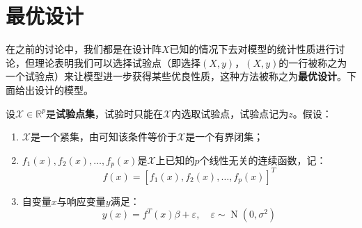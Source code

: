 \section{最优设计}
在之前的讨论中，我们都是在设计阵$X$已知的情况下去对模型的统计性质进行讨论，但理论表明我们可以选择试验点（即选择$(X,y)$，$(X,y)$的一行被称之为一个试验点）来让模型进一步获得某些优良性质，这种方法被称之为\textbf{最优设计}。下面给出设计的模型。

\begin{definition}\label{model:design}
	设$\mathcal{X}\in\mathbb{R}^{p}$是\textbf{试验点集}，试验时只能在$\mathcal{X}$内选取试验点，试验点记为$z$。假设：
	\begin{enumerate}
		\item $\mathcal{X}$是一个紧集，由可知该条件等价于$\mathcal{X}$是一个有界闭集；
		\item $f_1(x),f_2(x),\dots,f_p(x)$是$\mathcal{X}$上已知的$p$个线性无关的连续函数，记：
		\begin{equation*}
			f(x)=[f_1(x),f_2(x),\dots,f_p(x)]^T
		\end{equation*}
		\item 自变量$x$与响应变量$y$满足：
		\begin{equation*}
			y(x)=f^T(x)\beta+\varepsilon,\quad\varepsilon\sim\operatorname{N}(0,\sigma^2)
		\end{equation*}
	\end{enumerate}
\end{definition}
